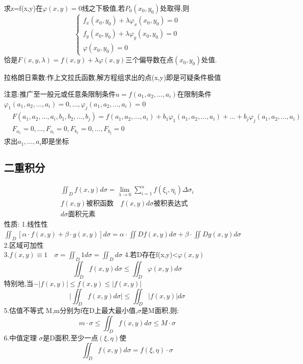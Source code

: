 \documentclass[10pt, a4paper, oneside]{ctexart}
\begin{document}
\begin{sloppypar}
	求z=f(x,y)在$\varphi(x,y)=0$线之下极值,若$P_0(x_0,y_0)$处取得,则
	$$
		\begin{cases}
			f_x(x_0,y_0)+\lambda\varphi_x(x_0, y_0)=0 \\
			f_y(x_0,y_0)+\lambda\varphi_y(x_0, y_0)=0 \\
			\varphi(x_0, y_0)=0
		\end{cases}
	$$
	恰是$F(x,y,\lambda)=f(x,y)+\lambda\varphi(x,y)$三个偏导数在点$(x_0, y_0)$处值.

	拉格朗日乘数:作上文拉氏函数,解方程组求出的点(x,y)即是可疑条件极值

	注意:推广至一般元或任意条限制条件$u=f(a_1,a_2, \ldots,a_i)$在限制条件\\$\varphi_1(a_1,a_2, \ldots,a_i)=0, \ldots, \varphi_j(a_1,a_2, \ldots,a_i)=0$
		\begin{align*}
			 & F(a_1,a_2, \ldots,a_i, b_1,b_2, \ldots,b_j)=f(a_1,a_2, \ldots,a_i)+b_1\varphi_1(a_1,a_2, \ldots,a_i)+\ldots+b_j\varphi_j(a_1,a_2, \ldots,a_i) \\
			 & F_{a_1}=0, \ldots, F_{a_i}=0,F_{b_1}=0, \ldots, F_{b_j} = 0
		\end{align*}
		求出$a_1, \ldots, a_i$即是坐标
		\subsection{二重积分}
		\begin{gather*}
			\iint_D f(x,y)d\sigma=\lim_{\lambda\to 0}\sum_{i = 1}^{n} f(\xi_i, \eta_i )\Delta\sigma _i
			\\f(x,y)\text{被积函数}\quad f(x,y)d\sigma\text{被积表达式}\\
			d\sigma\text{面积元素}
		\end{gather*}
		性质:
		1.线性性$\iint_{D}[\alpha\cdot f(x,y)+\beta\cdot g(x,y)]d\sigma = \alpha\cdot\iint{D}f(x,y)d\sigma+\beta\cdot\iint{D}g(x,y)d\sigma
	$\\
		2.区域可加性\\
		3.$f(x,y)\equiv 1 \quad \sigma =\iint_{D}1d\sigma =\iint_{D}d\sigma$
		4.若D存在f(x,y)<$\varphi (x,y)$
	$$\iint_{D}f(x,y)d\sigma \leq \iint_{D}\varphi(x,y)d\sigma$$
	特别地,当$-\lvert f(x,y) \rvert\leq f(x,y)
		\leq \lvert f(x,y) \rvert$
	$$
		\lvert \iint_{D}f(x,y)d\sigma \rvert \leq \iint_{D}\lvert f(x,y)\rvert d\sigma
	$$
	5.估值不等式
	M,m分别为f在D上最大最小值,$\sigma$是M面积,则:
	$$
		m\cdot\sigma \leq \iint_{D}f(x,y)d\sigma \leq M\cdot\sigma
	$$
	6.中值定理
	$\sigma$是D面积,至少一点$(\xi ,\eta)$使
	$$
		\iint_{D}f(x,y)d\sigma=f(\xi ,\eta)\cdot\sigma
	$$


\end{sloppypar}
\end{document}
